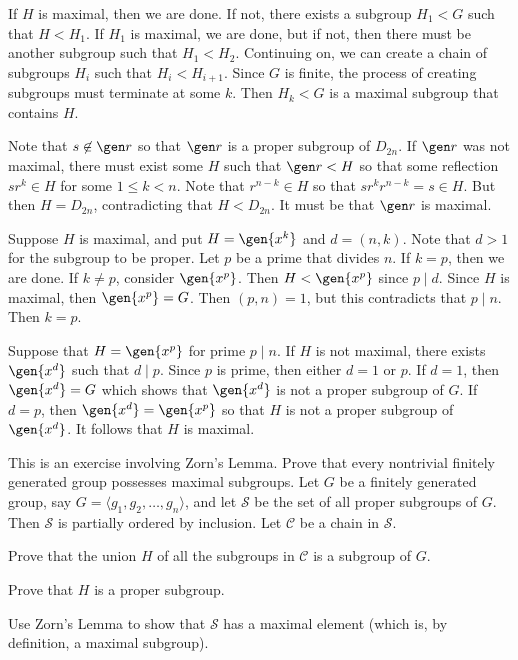 \begin{solalph}
    \item If $H$ is maximal, then we are done. If not, there exists a subgroup $H_1 < G$ such that $H < H_1$. If $H_1$ is maximal, we are done, but if not, then there must be another subgroup such that $H_1 < H_2$. Continuing on, we can create a chain of subgroups $H_i$ such that $H_i < H_{i + 1}$. Since $G$ is finite, the process of creating subgroups must terminate at some $k$. Then $H_k < G$ is a maximal subgroup that contains $H$.
    \item Note that $s \not\in \gen r$ so that $\gen r$ is a proper subgroup of $D_{2n}$. If $\gen r$ was not maximal, there must exist some $H$ such that $\gen r < H$ so that some reflection $sr^k \in H$ for some $1 \leq k < n$. Note that $r^{n - k} \in H$ so that $sr^kr^{n - k} = s \in H$. But then $H = D_{2n}$, contradicting that $H < D_{2n}$. It must be that $\gen r$ is maximal.
    \item Suppose $H$ is maximal, and put $H = \gen{x^k}$ and $d = (n, k)$. Note that $d > 1$ for the subgroup to be proper. Let $p$ be a prime that divides $n$. If $k = p$, then we are done. If $k \neq p$, consider $\gen{x^p}$. Then $H < \gen{x^p}$ since $p \mid d$. Since $H$ is maximal, then $\gen{x^p} = G$. Then $(p, n) = 1$, but this contradicts that $p \mid n$. Then $k = p$.
    
    Suppose that $H = \gen{x^p}$ for prime $p \mid n$. If $H$ is not maximal, there exists $\gen{x^d}$ such that $d \mid p$. Since $p$ is prime, then either $d = 1$ or $p$. If $d = 1$, then $\gen{x^d} = G$ which shows that $\gen{x^d}$ is not a proper subgroup of $G$. If $d = p$, then $\gen{x^d} = \gen{x^p}$ so that $H$ is not a proper subgroup of $\gen{x^d}$. It follows that $H$ is maximal.
\end{solalph}

\begin{specialexercise}\label{ex2.4.17}
    This is an exercise involving Zorn's Lemma. Prove that every nontrivial finitely generated group possesses maximal subgroups. Let $G$ be a finitely generated group, say $G=\langle g_1, g_2, \ldots, g_n\rangle$, and let $\mathcal{S}$ be the set of all proper subgroups of $G$. Then $\mathcal{S}$ is partially ordered by inclusion. Let $\mathcal{C}$ be a chain in $\mathcal{S}$.
    \begin{subproblems}
        \item Prove that the union $H$ of all the subgroups in $\mathcal{C}$ is a subgroup of $G$.
        \item Prove that $H$ is a proper subgroup.  
        \item Use Zorn's Lemma to show that $\mathcal{S}$ has a maximal element (which is, by definition, a maximal subgroup).
    \end{subproblems}
\end{specialexercise}

